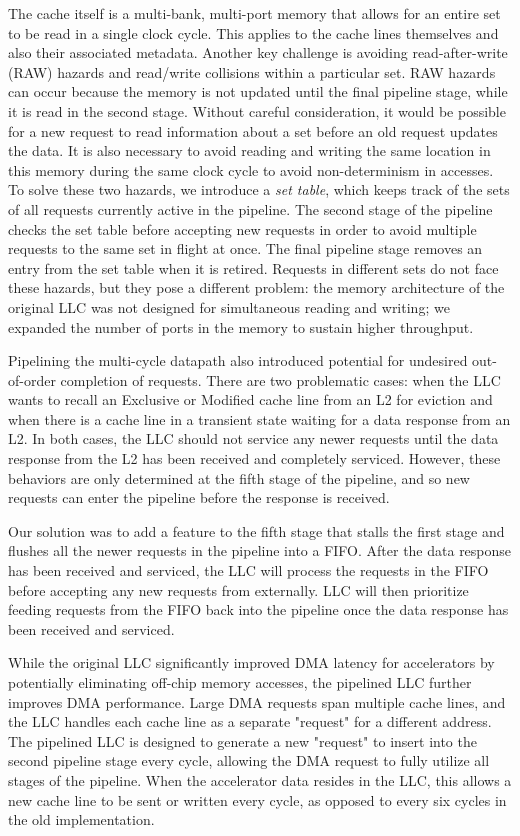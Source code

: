 \par The cache itself is a multi-bank, multi-port memory that allows for an
entire set to be read in a single clock cycle. This applies to the cache lines
themselves and also their associated metadata. Another key challenge is
avoiding read-after-write (RAW) hazards and read/write collisions within a
particular set.  RAW hazards can occur because the memory is not updated until
the final pipeline stage, while it is read in the second stage. Without careful
consideration, it would be possible for a new request to read information about
a set before an old request updates the data. It is also necessary to avoid
reading and writing the same location in this memory during the same clock
cycle to avoid non-determinism in accesses. To solve these two hazards, we introduce
a \emph{set table}, which keeps track of the sets of all requests currently active
in the pipeline. The second stage of the pipeline checks the set table before accepting
new requests in order to avoid multiple requests to the same set in flight at once. The final
pipeline stage removes an entry from the set table when it is retired. Requests
in different sets do not face these hazards, but they pose a different problem:
the memory architecture of the original LLC was not designed for simultaneous
reading and writing; we expanded the number of ports in the memory to sustain
higher throughput.

\par Pipelining the multi-cycle datapath also introduced potential for
undesired out-of-order completion of requests. There are two problematic cases:
when the LLC wants to recall an Exclusive or Modified cache line from an L2 for
eviction and when there is a cache line in a transient state waiting for a data
response from an L2. In both cases, the LLC should not service any newer
requests until the data response from the L2 has been received and completely
serviced. However, these behaviors are only determined at the fifth stage of
the pipeline, and so new requests can enter the pipeline before the response is
received.

Our solution was to add a feature to the fifth stage that stalls the first
stage and flushes all the newer requests in the pipeline into a FIFO. After the
data response has been received and serviced, the LLC will process the requests
in the FIFO before accepting any new requests from externally.
LLC will then prioritize feeding requests from the FIFO back into the pipeline
once the data response has been received and serviced.

\par While the original LLC significantly improved DMA latency for accelerators
by potentially eliminating off-chip memory accesses, the pipelined LLC
further improves DMA performance. Large DMA requests span multiple
cache lines, and the LLC handles each cache line as a separate
"request" for a different address. The pipelined LLC is designed to generate a
new "request" to insert into the second pipeline stage every cycle, allowing
the DMA request to fully utilize all stages of the pipeline. When the accelerator
data resides in the LLC, this allows a new cache line to be sent or written every
cycle, as opposed to every six cycles in the old implementation.

